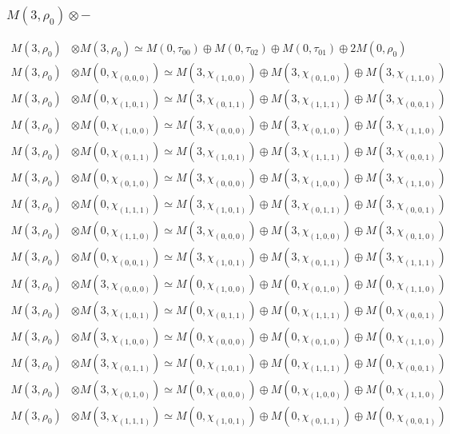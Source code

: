 \subsubsection{$ M(3,\rho_{0})\otimes -$}
\begin{align*}
M(3,\rho_{0}) &\otimes M(3,\rho_{0}) \simeq M(0,\tau_{00}) \oplus M(0,\tau_{02}) \oplus M(0,\tau_{01}) \oplus 2 M(0,\rho_{0})\\
M(3,\rho_{0}) &\otimes M(0,\chi_{(0,0,0)}) \simeq M(3,\chi_{(1,0,0)}) \oplus M(3,\chi_{(0,1,0)}) \oplus M(3,\chi_{(1,1,0)})\\
M(3,\rho_{0}) &\otimes M(0,\chi_{(1,0,1)}) \simeq M(3,\chi_{(0,1,1)}) \oplus M(3,\chi_{(1,1,1)}) \oplus M(3,\chi_{(0,0,1)})\\
M(3,\rho_{0}) &\otimes M(0,\chi_{(1,0,0)}) \simeq M(3,\chi_{(0,0,0)}) \oplus M(3,\chi_{(0,1,0)}) \oplus M(3,\chi_{(1,1,0)})\\
M(3,\rho_{0}) &\otimes M(0,\chi_{(0,1,1)}) \simeq M(3,\chi_{(1,0,1)}) \oplus M(3,\chi_{(1,1,1)}) \oplus M(3,\chi_{(0,0,1)})\\
M(3,\rho_{0}) &\otimes M(0,\chi_{(0,1,0)}) \simeq M(3,\chi_{(0,0,0)}) \oplus M(3,\chi_{(1,0,0)}) \oplus M(3,\chi_{(1,1,0)})\\
M(3,\rho_{0}) &\otimes M(0,\chi_{(1,1,1)}) \simeq M(3,\chi_{(1,0,1)}) \oplus M(3,\chi_{(0,1,1)}) \oplus M(3,\chi_{(0,0,1)})\\
M(3,\rho_{0}) &\otimes M(0,\chi_{(1,1,0)}) \simeq M(3,\chi_{(0,0,0)}) \oplus M(3,\chi_{(1,0,0)}) \oplus M(3,\chi_{(0,1,0)})\\
M(3,\rho_{0}) &\otimes M(0,\chi_{(0,0,1)}) \simeq M(3,\chi_{(1,0,1)}) \oplus M(3,\chi_{(0,1,1)}) \oplus M(3,\chi_{(1,1,1)})\\
M(3,\rho_{0}) &\otimes M(3,\chi_{(0,0,0)}) \simeq M(0,\chi_{(1,0,0)}) \oplus M(0,\chi_{(0,1,0)}) \oplus M(0,\chi_{(1,1,0)})\\
M(3,\rho_{0}) &\otimes M(3,\chi_{(1,0,1)}) \simeq M(0,\chi_{(0,1,1)}) \oplus M(0,\chi_{(1,1,1)}) \oplus M(0,\chi_{(0,0,1)})\\
M(3,\rho_{0}) &\otimes M(3,\chi_{(1,0,0)}) \simeq M(0,\chi_{(0,0,0)}) \oplus M(0,\chi_{(0,1,0)}) \oplus M(0,\chi_{(1,1,0)})\\
M(3,\rho_{0}) &\otimes M(3,\chi_{(0,1,1)}) \simeq M(0,\chi_{(1,0,1)}) \oplus M(0,\chi_{(1,1,1)}) \oplus M(0,\chi_{(0,0,1)})\\
M(3,\rho_{0}) &\otimes M(3,\chi_{(0,1,0)}) \simeq M(0,\chi_{(0,0,0)}) \oplus M(0,\chi_{(1,0,0)}) \oplus M(0,\chi_{(1,1,0)})\\
M(3,\rho_{0}) &\otimes M(3,\chi_{(1,1,1)}) \simeq M(0,\chi_{(1,0,1)}) \oplus M(0,\chi_{(0,1,1)}) \oplus M(0,\chi_{(0,0,1)})\\

\end{align*}
